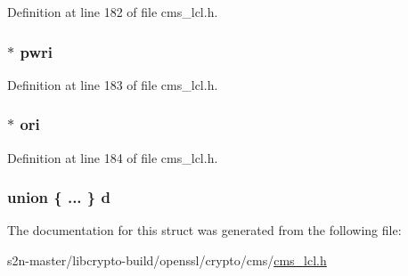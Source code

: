 Definition at line 182 of file cms\+\_\+lcl.\+h.

\subsubsection[{\texorpdfstring{pwri}{pwri}}]{$\ast$ pwri}\hypertarget{struct_c_m_s___recipient_info__st_ad6764854cc62cf01140b539a2ac05a08}{}\label{struct_c_m_s___recipient_info__st_ad6764854cc62cf01140b539a2ac05a08}


Definition at line 183 of file cms\+\_\+lcl.\+h.

\subsubsection[{\texorpdfstring{ori}{ori}}]{$\ast$ ori}\hypertarget{struct_c_m_s___recipient_info__st_aaa4a86eada3b24968990baedf4434cb3}{}\label{struct_c_m_s___recipient_info__st_aaa4a86eada3b24968990baedf4434cb3}


Definition at line 184 of file cms\+\_\+lcl.\+h.

\subsubsection[{\texorpdfstring{d}{d}}]{\setlength{\rightskip}{0pt plus 5cm}union \{ ... \}   d}\hypertarget{struct_c_m_s___recipient_info__st_a37c3f6e5cfb37b122d6194907aa3c721}{}\label{struct_c_m_s___recipient_info__st_a37c3f6e5cfb37b122d6194907aa3c721}


The documentation for this struct was generated from the following file\+:\begin{DoxyCompactItemize}
\item 
s2n-\/master/libcrypto-\/build/openssl/crypto/cms/\hyperlink{cms__lcl_8h}{cms\+\_\+lcl.\+h}\end{DoxyCompactItemize}
